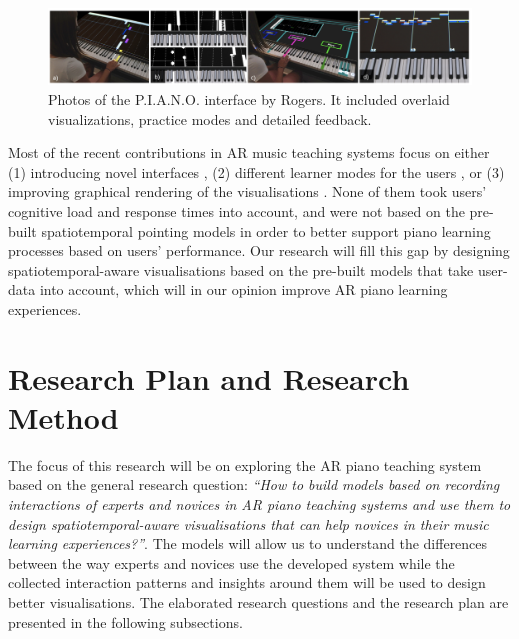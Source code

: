 \documentclass[manuscript,screen]{acmart}
\begin{document}
\begin{figure}[h]
\centering
 \includegraphics[width=12cm]{figures/pianoUBC.png}
    \caption{Photos of the P.I.A.N.O. interface by Rogers. It included overlaid visualizations, practice modes and detailed feedback. 
    }\label{fig:ubicomp}
\end{figure}

Most of the recent contributions in AR music teaching systems focus on either (1) introducing novel interfaces \cite{barakonyi2005augmented, huang2011piano}, (2) different learner modes for the users \cite{weing2013piano, rogers2014piano}, or (3) improving graphical rendering of the visualisations \cite{chow2013music, zheng2013general}. None of them took users’ cognitive load and response times into account, and were not based on the pre-built spatiotemporal pointing models in order to better support piano learning processes based on users’ performance. Our research will fill this gap by designing spatiotemporal-aware visualisations based on the pre-built models that take user-data into account, which will in our opinion improve AR piano learning experiences.\\

\section{Research Plan and Research Method}
The focus of this research will be on exploring the AR piano teaching system based on the general research question: \textit{“How to  build models based on recording interactions of experts and novices in AR piano teaching systems and use them to design spatiotemporal-aware visualisations that can help novices in their music learning experiences?”}. The models will allow us to understand the differences between the way experts and novices use the developed system while the collected interaction patterns and insights around them will be used to design better visualisations. The elaborated research questions and the research plan are presented in the following subsections. 
\end{document}
